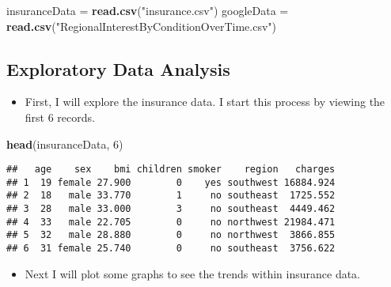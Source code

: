 \documentclass[]{article}
\newenvironment{Shaded}{\begin{snugshade}}{\end{snugshade}}
\newcommand{\DataTypeTok}[1]{\textcolor[rgb]{0.13,0.29,0.53}{#1}}
\newcommand{\DecValTok}[1]{\textcolor[rgb]{0.00,0.00,0.81}{#1}}
\newcommand{\FloatTok}[1]{\textcolor[rgb]{0.00,0.00,0.81}{#1}}
\newcommand{\KeywordTok}[1]{\textcolor[rgb]{0.13,0.29,0.53}{\textbf{#1}}}
\newcommand{\NormalTok}[1]{#1}
\newcommand{\OperatorTok}[1]{\textcolor[rgb]{0.81,0.36,0.00}{\textbf{#1}}}
\newcommand{\StringTok}[1]{\textcolor[rgb]{0.31,0.60,0.02}{#1}}
\providecommand{\tightlist}{%
  \setlength{\itemsep}{0pt}\setlength{\parskip}{0pt}}
\begin{document}
\begin{Shaded}
\begin{Highlighting}[]
\NormalTok{insuranceData =}\StringTok{ }\KeywordTok{read.csv}\NormalTok{(}\StringTok{"insurance.csv"}\NormalTok{)}
\NormalTok{googleData =}\StringTok{ }\KeywordTok{read.csv}\NormalTok{(}\StringTok{"RegionalInterestByConditionOverTime.csv"}\NormalTok{)}
\end{Highlighting}
\end{Shaded}

\hypertarget{exploratory-data-analysis}{%
\subsection{Exploratory Data Analysis}\label{exploratory-data-analysis}}

\begin{itemize}
\tightlist
\item
  First, I will explore the insurance data. I start this process by
  viewing the first 6 records.
\end{itemize}

\begin{Shaded}
\begin{Highlighting}[]
\KeywordTok{head}\NormalTok{(insuranceData, }\DecValTok{6}\NormalTok{)}
\end{Highlighting}
\end{Shaded}

\begin{verbatim}
##   age    sex    bmi children smoker    region   charges
## 1  19 female 27.900        0    yes southwest 16884.924
## 2  18   male 33.770        1     no southeast  1725.552
## 3  28   male 33.000        3     no southeast  4449.462
## 4  33   male 22.705        0     no northwest 21984.471
## 5  32   male 28.880        0     no northwest  3866.855
## 6  31 female 25.740        0     no southeast  3756.622
\end{verbatim}

\begin{itemize}
\tightlist
\item
  Next I will plot some graphs to see the trends within insurance data.
\end{itemize}

\begin{Shaded}
\end{Shaded}
\end{document}

